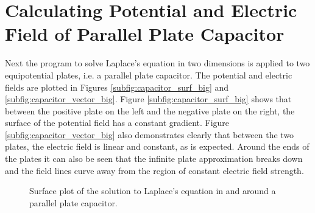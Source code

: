 \section{Calculating Potential and Electric Field of Parallel Plate Capacitor}
\label{sec:parallel_plate_capacitor}

Next the program to solve Laplace's equation in two dimensions is applied to two equipotential plates, i.e. a parallel plate capacitor. The potential and electric fields are plotted in Figures \ref{subfig:capacitor_surf_big} and \ref{subfig:capacitor_vector_big}. Figure \ref{subfig:capacitor_surf_big} shows that between the positive plate on the left and the negative plate on the right, the surface of the potential field has a constant gradient. Figure \ref{subfig:capacitor_vector_big} also demonstrates clearly that between the two plates, the electric field is linear and constant, as is expected. Around the ends of the plates it can also be seen that the infinite plate approximation breaks down and the field lines curve away from the region of constant electric field strength.

\begin{figure}
    \centering
    \caption{Surface plot of the solution to Laplace's equation in and around a parallel plate capacitor.}
    \label{fig:capacitor_big}
\end{figure}

